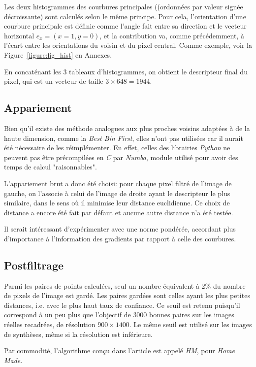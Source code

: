 \documentclass[
	a4paper, %
	10pt, %
	unnumberedsections, %
	twoside, %
]{LTJournalArticle}
\begin{document}
Les deux histogrammes des courbures principales ((ordonnées par valeur signée décroissante)
sont calculés selon le même principe. Pour cela,
l'orientation d'une courbure principale est définie comme l'angle fait entre sa
direction et le vecteur horizontal $e_x=(x=1, y=0)$, et la contribution va,
comme précédemment, à l'écart entre les orientations du voisin et du pixel central.
Comme exemple, voir la Figure~\ref{figure:fig_hist} en Annexes.

En concaténant les $3$ tableaux d'histogrammes, on obtient le descripteur final du pixel,
qui est un vecteur de taille $3 \times 648 = 1944$.


\subsection{Appariement}

Bien qu'il existe des méthode analogues aux plus proches voisins adaptées à de la haute dimension,
comme la \textit{Best Bin First}, elles n'ont pas utilisées car il aurait été nécessaire de les réimplémenter.
En effet, celles des librairies \textit{Python} ne peuvent pas être
précompilées en \textit{C} par \textit{Numba}, module utilisé pour avoir des temps
de calcul "raisonnables".

L'appariement brut a donc été choisi: pour chaque pixel filtré de l'image de gauche,
on l'associe à celui de l'image de droite ayant le descripteur le plus similaire,
dans le sens où il minimise leur distance euclidienne.
Ce choix de distance a encore été fait par défaut et aucune autre distance
n'a été testée.

Il serait intéressant d'expérimenter avec une norme pondérée, accordant plus d'importance
à l'information des gradients par rapport à celle des courbures.

\subsection{Postfiltrage}
Parmi les paires de points calculées, seul un nombre équivalent à $2 \%$ du nombre de pixels de l'image est gardé.
Les paires gardées sont celles ayant les plus petites distances, i.e. avec le plus haut taux
de confiance. Ce seuil est retenu puisqu'il correspond à un peu plus que
l'objectif de $3000$ bonnes paires sur les images réelles recadrées, de résolution
$900 \times 1400$.
Le même seuil est utilisé sur les images de synthèses, même si la résolution est inférieure.

Par commodité, l'algorithme conçu dans l'article est appelé \textit{HM}, pour \textit{Home Made}.
\end{document}
